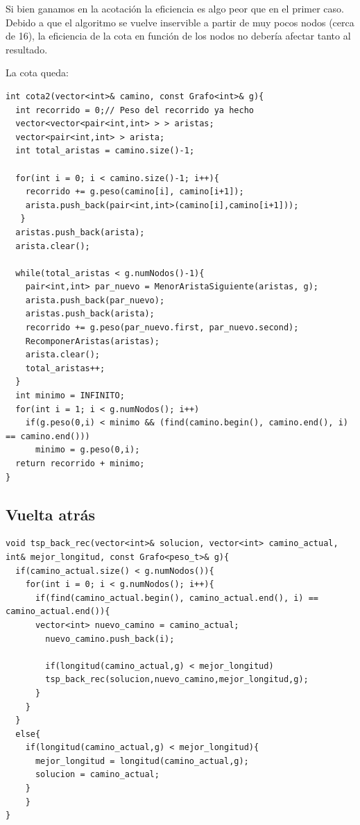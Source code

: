 Si bien ganamos en la acotación %
la eficiencia es algo peor que en el primer caso. Debido a que el algoritmo se vuelve inservible a partir de muy pocos nodos (cerca de 16), la eficiencia de la cota en función de los nodos no debería afectar tanto al resultado. %

La cota queda:
\begin{lstlisting}
int cota2(vector<int>& camino, const Grafo<int>& g){
  int recorrido = 0;// Peso del recorrido ya hecho
  vector<vector<pair<int,int> > > aristas;
  vector<pair<int,int> > arista;
  int total_aristas = camino.size()-1;

  for(int i = 0; i < camino.size()-1; i++){
    recorrido += g.peso(camino[i], camino[i+1]);
    arista.push_back(pair<int,int>(camino[i],camino[i+1]));
   }
  aristas.push_back(arista);
  arista.clear();

  while(total_aristas < g.numNodos()-1){
    pair<int,int> par_nuevo = MenorAristaSiguiente(aristas, g);
    arista.push_back(par_nuevo);
    aristas.push_back(arista);
    recorrido += g.peso(par_nuevo.first, par_nuevo.second);
    RecomponerAristas(aristas);
    arista.clear();
    total_aristas++;
  }
  int minimo = INFINITO;
  for(int i = 1; i < g.numNodos(); i++)
    if(g.peso(0,i) < minimo && (find(camino.begin(), camino.end(), i) == camino.end()))
      minimo = g.peso(0,i);
  return recorrido + minimo;
}
\end{lstlisting}

\subsection{Vuelta atrás}

\begin{lstlisting}
void tsp_back_rec(vector<int>& solucion, vector<int> camino_actual, int& mejor_longitud, const Grafo<peso_t>& g){
  if(camino_actual.size() < g.numNodos()){
    for(int i = 0; i < g.numNodos(); i++){
      if(find(camino_actual.begin(), camino_actual.end(), i) == camino_actual.end()){
      vector<int> nuevo_camino = camino_actual;
        nuevo_camino.push_back(i);

        if(longitud(camino_actual,g) < mejor_longitud)
        tsp_back_rec(solucion,nuevo_camino,mejor_longitud,g);
      }
    }
  }
  else{
    if(longitud(camino_actual,g) < mejor_longitud){
      mejor_longitud = longitud(camino_actual,g);
      solucion = camino_actual;
    }
	}
}
\end{lstlisting}

